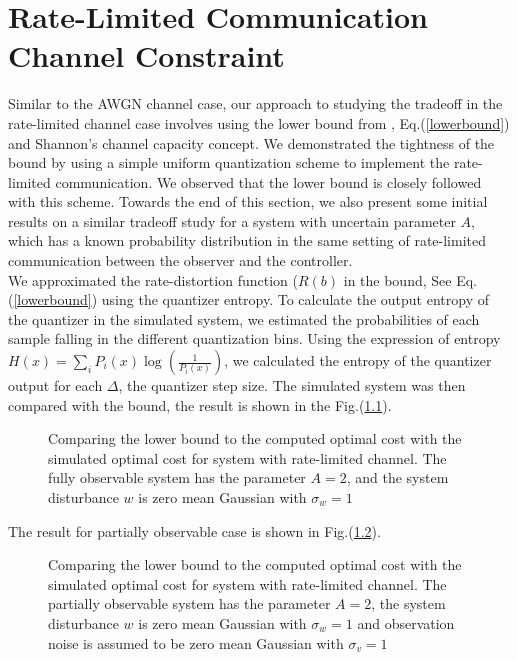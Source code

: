 \documentclass[12pt]{caltech_thesis_finalreport}
\begin{document}
\chapter{Rate-Limited Communication Channel Constraint}

		Similar to the AWGN channel case, our approach to studying the tradeoff in the rate-limited channel case involves using the lower bound from \cite{victoria}, Eq.(\ref{lowerbound}) and Shannon's channel capacity concept. We demonstrated the tightness of the bound by using a simple uniform quantization scheme to implement the rate-limited communication. We observed that the lower bound is closely followed with this scheme. Towards the end of this section, we also present some initial results on a similar tradeoff study for a system with uncertain parameter $A$, which has a known probability distribution in the same setting of rate-limited communication between the observer and the controller. 
		\\We approximated the rate-distortion function ($R(b)$ in the bound, See Eq.(\ref{lowerbound}) using the quantizer entropy. To calculate the output entropy of the quantizer in the simulated system, we estimated the probabilities of each sample falling in the different quantization bins. Using the expression of entropy $H(x) = \sum\limits_{i} P_{i}(x)\log\left(\frac{1}{P_{i}(x)}\right)$, we calculated the entropy of the quantizer output for each $\Delta$, the quantizer step size. The simulated system was then compared with the bound, the result is shown in the Fig.(\ref{lowerboundQ_sim}).
		\begin{figure}[H]
			  \centering
%			  
			  \resizebox{15cm}{!}{}
			  \caption{Comparing the lower bound to the computed optimal cost with the simulated optimal cost for system with rate-limited channel. The fully observable system has the parameter $A = 2$, and the system disturbance $w$ is zero mean Gaussian with $\sigma_{w} = 1$}
			 \label{lowerboundQ_sim}
		\end{figure}	
		The result for partially observable case is shown in Fig.(\ref{lowerboundQ_sim_v}).
		\begin{figure}[H]
			  \centering
%			  
			 \resizebox{15cm}{!}{}
			  \caption{Comparing the lower bound to the computed optimal cost with the simulated optimal cost for system with rate-limited channel. The partially observable system has the parameter $A = 2$, the system disturbance $w$ is zero mean Gaussian with $\sigma_{w} = 1$ and observation noise is assumed to be zero mean Gaussian with $\sigma_{v} = 1$}
			 \label{lowerboundQ_sim_v}
		\end{figure}	
\end{document}
